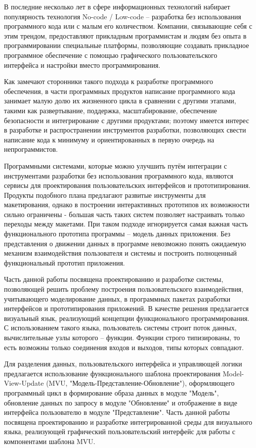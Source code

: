 
{\actuality} В последние несколько лет в сфере информационных технологий
набирает популярность технология No-code / Low-code -- разработка без
использования программного кода или с малым его количеством. Компании,
связывающие себя с этим трендом, предоставляют прикладным программистам
и людям без опыта в программировании специальные платформы, позволяющие
создавать прикладное программное обеспечение с помощью графического
пользовательского интерфейса и настройки вместо программирования.

Как замечают сторонники такого подхода к разработке программного обеспечения,
в части программных продуктов написание программного кода занимает
малую долю их жизненного цикла в сравнении с другими этапами, такими как
развертывание, поддержка, масштабирование, обеспечение безопасности и 
интегрирование с другими продуктами; поэтому имеется интерес в разработке
и распространении инструментов разработки, позволяющих свести написание кода
к минимуму и ориентированных в первую очередь на непрограммистов.

Программными системами, которые можно улучшить путём интеграции с инструментами
разработки без использования программного кода, являются сервисы для 
проектирования пользовательских интерфейсов и прототипирования. Продукты
подобного плана предлагают развитые инструменты для макетирования, однако в
построении интерактивных прототипов их возможности сильно ограничены - большая
часть таких систем позволяет настраивать только переходы между макетами. 
При таком подходе игнорируется самая важная часть функционального прототипа 
программы -- модель данных приложения. Без представления о движении данных
в программе невозможно понять ожидаемую механизм взаимодействия пользователя
и системы и построить полноценный функциональный прототип приложения.

Часть данной работы посвящена проектированию и разработке системы, позволяющей
решить проблему построения пользовательского взаимодействия, учитывающего
моделирование данных,  в программных пакетах разработки интерфейсов и
прототипирования приложений. В качестве решения предлагается 
визуальный язык, реализующий концепции функционального программирования.
С использованием такого языка, пользователь системы строит поток данных,
вычислительные узлы которого -- функции. Функции строго типизированы, то
есть возможны только соединения входов и выходов, типы которых совпадают.

Для разделения данных, пользовательского интерфейса и управляющей логики
предлагается использование функционального шаблона проектирования
Model-View-Update (MVU, "Модель-Представление-Обновление"), оформляющего
программный цикл в формирование образа данных в модуле "Модель", обновление
данных по запросу в модуле "Обновление" и отображение в виде интерфейса 
пользователю в модуле "Представление". Часть данной работы посвящена
проектированию и разработке интегрированной среды для визуального языка, 
реализующей графический пользовательский интерфейс для работы с 
компонентами шаблона MVU.

